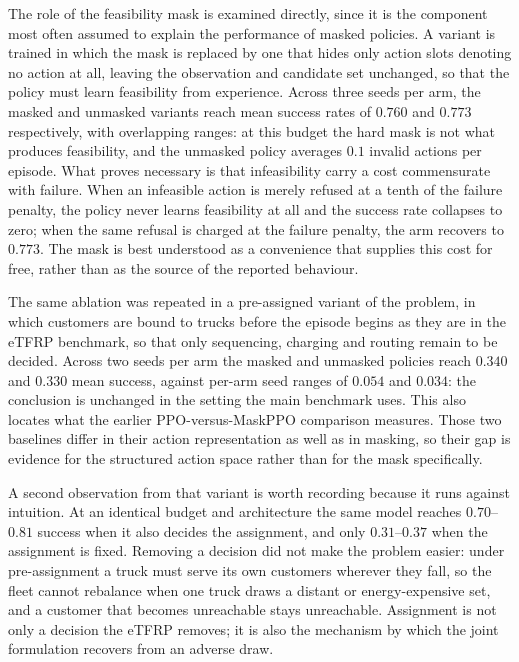 \documentclass[a4paper,fleqn]{cas-sc}
\begin{document}
The role of the feasibility mask is examined directly, since it is the component most often assumed to explain the performance of masked policies. A variant is trained in which the mask is replaced by one that hides only action slots denoting no action at all, leaving the observation and candidate set unchanged, so that the policy must learn feasibility from experience. Across three seeds per arm, the masked and unmasked variants reach mean success rates of $0.760$ and $0.773$ respectively, with overlapping ranges: at this budget the hard mask is not what produces feasibility, and the unmasked policy averages $0.1$ invalid actions per episode. What proves necessary is that infeasibility carry a cost commensurate with failure. When an infeasible action is merely refused at a tenth of the failure penalty, the policy never learns feasibility at all and the success rate collapses to zero; when the same refusal is charged at the failure penalty, the arm recovers to $0.773$. The mask is best understood as a convenience that supplies this cost for free, rather than as the source of the reported behaviour.

The same ablation was repeated in a pre-assigned variant of the problem, in which customers are bound to
trucks before the episode begins as they are in the eTFRP benchmark, so that only sequencing, charging and routing
remain to be decided. Across two seeds per arm the masked and unmasked policies reach $0.340$ and $0.330$ mean
success, against per-arm seed ranges of $0.054$ and $0.034$: the conclusion is unchanged in the setting the main
benchmark uses. This also locates what the earlier PPO-versus-MaskPPO comparison measures. Those two baselines differ
in their action representation as well as in masking, so their gap is evidence for the structured action space rather
than for the mask specifically.

A second observation from that variant is worth recording because it runs against intuition. At an identical budget
and architecture the same model reaches $0.70$--$0.81$ success when it also decides the assignment, and only
$0.31$--$0.37$ when the assignment is fixed. Removing a decision did not make the problem easier: under
pre-assignment a truck must serve its own customers wherever they fall, so the fleet cannot rebalance when one truck
draws a distant or energy-expensive set, and a customer that becomes unreachable stays unreachable. Assignment is not
only a decision the eTFRP removes; it is also the mechanism by which the joint formulation recovers from an adverse
draw.
\end{document}
